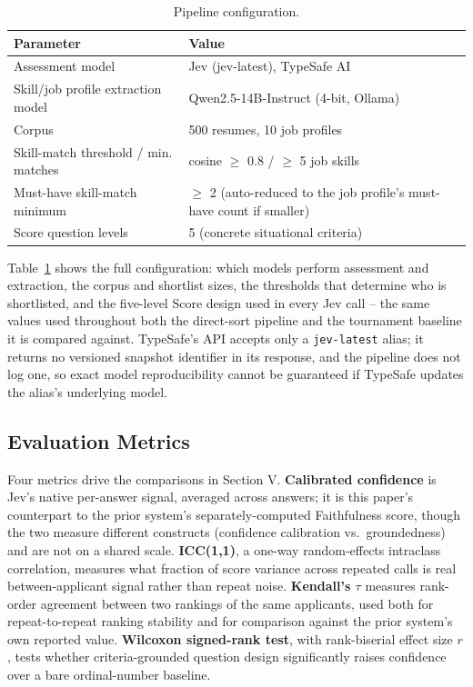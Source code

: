 \documentclass[journal]{IEEEtran}
\begin{document}
\begin{table}[H]
\caption{Pipeline configuration.}
\label{tab_config}
\centering
\footnotesize
\begin{tabular}{p{1.5in}p{1.6in}}
\hline
Parameter & Value\\
\hline
Assessment model & Jev (jev-latest), TypeSafe AI\\
Skill/job profile extraction model & Qwen2.5-14B-Instruct (4-bit, Ollama)\\
Corpus & 500 resumes, 10 job profiles\\
Skill-match threshold / min. matches & cosine $\geq$ 0.8 / $\geq$ 5 job skills\\
Must-have skill-match minimum & $\geq$ 2 (auto-reduced to the job profile's must-have count if smaller)\\
Score question levels & 5 (concrete situational criteria)\\
\hline
\end{tabular}
\end{table}
Table~\ref{tab_config} shows the full configuration: which models perform assessment and extraction, the corpus and shortlist sizes, the thresholds that determine who is shortlisted, and the five-level Score design used in every Jev call -- the same values used throughout both the direct-sort pipeline and the tournament baseline it is compared against. TypeSafe's API accepts only a \texttt{jev-latest} alias; it returns no versioned snapshot identifier in its response, and the pipeline does not log one, so exact model reproducibility cannot be guaranteed if TypeSafe updates the alias's underlying model.

\subsection{Evaluation Metrics}
Four metrics drive the comparisons in Section V. \textbf{Calibrated confidence} is Jev's native per-answer signal, averaged across answers; it is this paper's counterpart to the prior system's separately-computed Faithfulness score, though the two measure different constructs (confidence calibration vs.\ groundedness) and are not on a shared scale. \textbf{ICC(1,1)}, a one-way random-effects intraclass correlation, measures what fraction of score variance across repeated calls is real between-applicant signal rather than repeat noise. \textbf{Kendall's $\tau$} measures rank-order agreement between two rankings of the same applicants, used both for repeat-to-repeat ranking stability and for comparison against the prior system's own reported value. \textbf{Wilcoxon signed-rank test}, with rank-biserial effect size $r$, tests whether criteria-grounded question design significantly raises confidence over a bare ordinal-number baseline.
\end{document}
